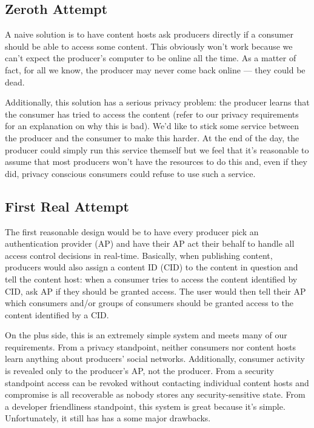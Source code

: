 \documentclass[pdftex,12pt,a4papaer,twoside,notitlepage]{report}
\begin{document}
\subsection{Zeroth Attempt}

A naive solution is to have content hosts ask producers directly if a consumer
should be able to access some content. This obviously won't work because we
can't expect the producer's computer to be online all the time. As a matter of
fact, for all we know, the producer may never come back online --- they could be
dead.

Additionally, this solution has a serious privacy problem: the producer learns
that the consumer has tried to access the content (refer to our privacy
requirements for an explanation on why this is bad). We'd like to stick some
service between the producer and the consumer to make this harder. At the end of
the day, the producer could simply run this service themself but we feel that
it's reasonable to assume that most producers won't have the resources to do
this and, even if they did, privacy conscious consumers could refuse to use
such a service.

\subsection{First Real Attempt}

The first reasonable design would be to have every producer pick an
authentication provider (AP) and have their AP act their behalf to handle all
access control decisions in real-time. Basically, when publishing content,
producers would also assign a content ID (CID) to the content in question and
tell the content host: when a consumer tries to access the content identified by
CID, ask AP if they should be granted access. The user would then tell their AP
which consumers and/or groups of consumers should be granted access to the
content identified by a CID.

On the plus side, this is an extremely simple system and meets many of our
requirements. From a privacy standpoint, neither consumers nor content hosts learn
anything about producers' social networks. Additionally, consumer activity is
revealed only to the producer's AP, not the producer. From a security standpoint
access can be revoked without contacting individual content hosts and compromise
is all recoverable as nobody stores any security-sensitive state. From a
developer friendliness standpoint, this system is great because it's simple.
Unfortunately, it still has has a some major drawbacks.
\end{document}
